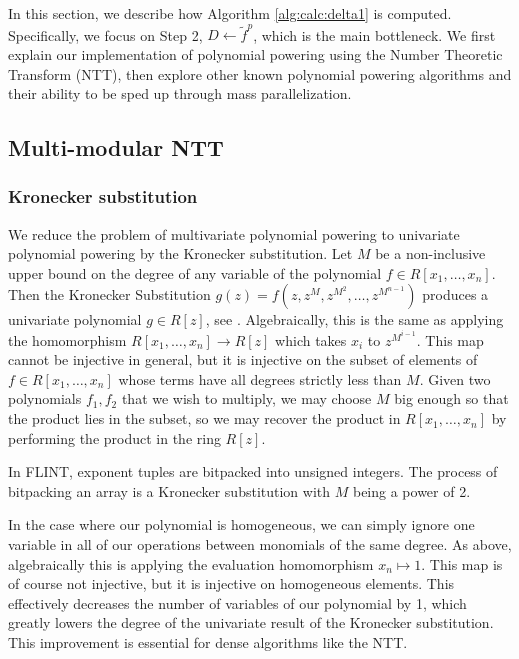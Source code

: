 In this section, we describe how Algorithm \ref{alg:calc:delta1} 
is computed. Specifically, we focus on Step 2, 
\(D \gets \tilde{f}^{p}\), which is the main 
bottleneck. We first explain our implementation 
of polynomial powering using the Number Theoretic 
Transform (NTT), then explore other known polynomial 
powering algorithms and their ability to be sped up 
through mass parallelization.

\subsection{Multi-modular NTT}

\subsubsection{Kronecker substitution}
We reduce the problem of multivariate 
polynomial powering to univariate polynomial powering
by the Kronecker substitution.
Let $M$ be a non-inclusive upper bound on the degree of any variable of the polynomial
$f \in R[x_1, \dots, x_n]$. 
Then the Kronecker Substitution 
\(g(z) = f(z, z^M, z^{M^2}, \dots, z^{M^{n-1}})\)
produces a univariate polynomial $g \in R[z]$,
see \cite{arnold-2014-kronecker}.
Algebraically, this is the same as applying the 
homomorphism 
\(R[x_{1}, \ldots, x_{n}] \xrightarrow{} R[z]\)
which takes \(x_{i}\) to
\(z^{M^{i-1}}\).
This map cannot be injective in general, but it
is injective on the subset of elements of
\(f \in R[x_{1}, \ldots, x_{n}]\) 
whose terms have all degrees strictly less than \(M\).
Given two polynomials \(f_{1}, f_{2}\) that
we wish to multiply, we may choose \(M\)
big enough
so that the product lies in the subset,
so we may recover the product in 
\(R[x_{1}, \ldots, x_{n}]\) by performing
the product in the ring \(R[z]\).

\begin{rmk}
    In FLINT, exponent tuples are bitpacked into unsigned 
    integers. The process of bitpacking an array is a 
    Kronecker substitution with $M$ being a power of 2.
\end{rmk}

In the case where our polynomial is homogeneous, 
we can simply ignore one variable in all of our 
operations between monomials of the same degree. 
As above, algebraically this is applying the evaluation
homomorphism \(x_{n} \mapsto 1\).
This map is of course not injective, but it is injective on homogeneous elements.
This effectively decreases the number of variables of our polynomial by 1, 
which greatly lowers the degree of the univariate result of the
Kronecker substitution.
This improvement is essential for dense algorithms like the NTT.

